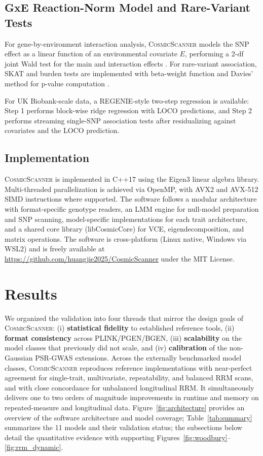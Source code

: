 \documentclass[11pt,a4paper]{article}
\newcommand{\CosmicScanner}{\textsc{CosmicScanner}}
\begin{document}
\subsection{GxE Reaction-Norm Model and Rare-Variant Tests}
\label{sec:gxe}

For gene-by-environment interaction analysis, \CosmicScanner{} models the SNP effect as a linear function of an environmental covariate $E$, performing a 2-df joint Wald test for the main and interaction effects \citep{ko2019}. For rare-variant association, SKAT and burden tests are implemented with beta-weight function and Davies' method for p-value computation \citep{zhou2022saigegene}.

For UK Biobank-scale data, a REGENIE-style two-step regression is available: Step 1 performs block-wise ridge regression with LOCO predictions, and Step 2 performs streaming single-SNP association tests after residualizing against covariates and the LOCO prediction.

\subsection{Implementation}
\label{sec:implementation}

\CosmicScanner{} is implemented in C++17 using the Eigen3 linear algebra library. Multi-threaded parallelization is achieved via OpenMP, with AVX2 and AVX-512 SIMD instructions where supported. The software follows a modular architecture with format-specific genotype readers, an LMM engine for null-model preparation and SNP scanning, model-specific implementations for each trait architecture, and a shared core library (libCosmicCore) for VCE, eigendecomposition, and matrix operations. The software is cross-platform (Linux native, Windows via WSL2) and is freely available at \url{https://github.com/huangjie2025/CosmicScanner} under the MIT License.

\newpage
\section{Results}
\label{sec:results}

We organized the validation into four threads that mirror the design goals of \CosmicScanner: (i) \textbf{statistical fidelity} to established reference tools, (ii) \textbf{format consistency} across PLINK/PGEN/BGEN, (iii) \textbf{scalability} on the model classes that previously did not scale, and (iv) \textbf{calibration} of the non-Gaussian PSR-GWAS extensions. Across the externally benchmarked model classes, \CosmicScanner{} reproduces reference implementations with near-perfect agreement for single-trait, multivariate, repeatability, and balanced RRM scans, and with close concordance for unbalanced longitudinal RRM. It simultaneously delivers one to two orders of magnitude improvements in runtime and memory on repeated-measure and longitudinal data. Figure~\ref{fig:architecture} provides an overview of the software architecture and model coverage; Table~\ref{tab:summary} summarizes the 11 models and their validation status; the subsections below detail the quantitative evidence with supporting Figures~\ref{fig:woodbury}--\ref{fig:rrm_dynamic}.
\end{document}
